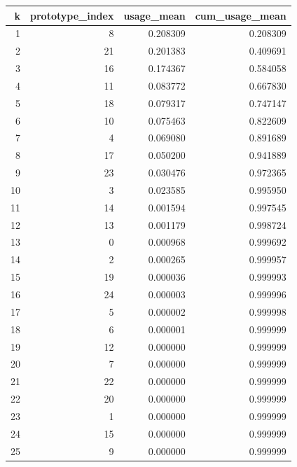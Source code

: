 \begin{tabular}{rrrr}
\toprule
k & prototype_index & usage_mean & cum_usage_mean \\
\midrule
1 & 8 & 0.208309 & 0.208309 \\
2 & 21 & 0.201383 & 0.409691 \\
3 & 16 & 0.174367 & 0.584058 \\
4 & 11 & 0.083772 & 0.667830 \\
5 & 18 & 0.079317 & 0.747147 \\
6 & 10 & 0.075463 & 0.822609 \\
7 & 4 & 0.069080 & 0.891689 \\
8 & 17 & 0.050200 & 0.941889 \\
9 & 23 & 0.030476 & 0.972365 \\
10 & 3 & 0.023585 & 0.995950 \\
11 & 14 & 0.001594 & 0.997545 \\
12 & 13 & 0.001179 & 0.998724 \\
13 & 0 & 0.000968 & 0.999692 \\
14 & 2 & 0.000265 & 0.999957 \\
15 & 19 & 0.000036 & 0.999993 \\
16 & 24 & 0.000003 & 0.999996 \\
17 & 5 & 0.000002 & 0.999998 \\
18 & 6 & 0.000001 & 0.999999 \\
19 & 12 & 0.000000 & 0.999999 \\
20 & 7 & 0.000000 & 0.999999 \\
21 & 22 & 0.000000 & 0.999999 \\
22 & 20 & 0.000000 & 0.999999 \\
23 & 1 & 0.000000 & 0.999999 \\
24 & 15 & 0.000000 & 0.999999 \\
25 & 9 & 0.000000 & 0.999999 \\
\bottomrule
\end{tabular}

